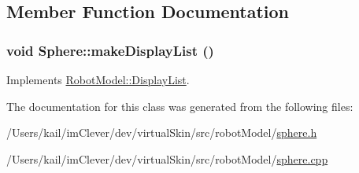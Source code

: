 \subsection{Member Function Documentation}
\hypertarget{class_robot_model_1_1_sphere_a838b5ae4f743aabe24a255dd61d2843c}{
\subsubsection[{makeDisplayList}]{\setlength{\rightskip}{0pt plus 5cm}void Sphere::makeDisplayList ()}}
\label{class_robot_model_1_1_sphere_a838b5ae4f743aabe24a255dd61d2843c}


Implements \hyperlink{class_robot_model_1_1_display_list_a842de97924298c7363e50aebd69e5a50}{RobotModel::DisplayList}.

The documentation for this class was generated from the following files:\begin{DoxyCompactItemize}
\item 
/Users/kail/imClever/dev/virtualSkin/src/robotModel/\hyperlink{sphere_8h}{sphere.h}\item 
/Users/kail/imClever/dev/virtualSkin/src/robotModel/\hyperlink{sphere_8cpp}{sphere.cpp}\end{DoxyCompactItemize}
